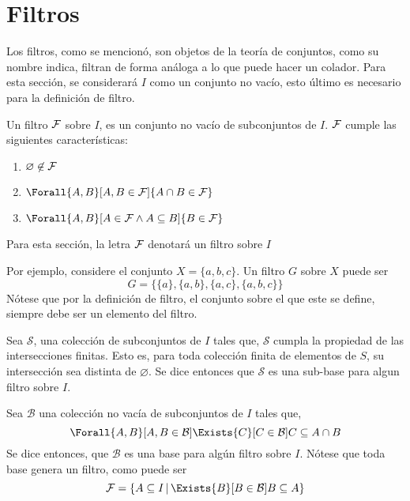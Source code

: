 \section{Filtros}

Los filtros, como se mencionó, son objetos de la teoría de conjuntos,
como su nombre indica, filtran de forma análoga a lo que
puede hacer un colador. Para esta sección, se considerará $I$ como un
conjunto no vacío, esto último es necesario para la definición de filtro.

\begin{definition}\label{def:filtro}
  Un filtro $\mathcal{F}$ sobre $I$, es un conjunto no vacío de subconjuntos de $I$.
  $\mathcal{F}$ cumple las siguientes características:
  \begin{enumerate}
    \item $\varnothing \not\in \mathcal{F}$
    \item $\Forall{A,B}[A,B \in \F]{A\cap B \in \F}$
    \item $\Forall{A,B}[A\in \F \land A \subseteq B]{B \in \F}$
  \end{enumerate}

  Para esta sección, la letra $\mathcal{F}$ denotará un filtro sobre $I$
\end{definition}

Por ejemplo, considere el conjunto $X=\{a,b,c\}$. Un filtro $G$ sobre $X$
puede ser 
\[G = \{\{a\}, \{a,b\}, \{a,c\}, \{a,b,c\}\}\]
Nótese que por la definición de filtro, el conjunto sobre el que este se
define, siempre debe ser un elemento del filtro.

\begin{definition}
  Sea $\mathcal{S}$, una colección de subconjuntos de $I$ tales que,
  $\mathcal{S}$ cumpla la propiedad de las intersecciones finitas. Esto es,
  para toda colección finita de elementos de $S$, su intersección sea
  distinta de $\varnothing$. Se dice entonces que $\mathcal{S}$ es una
  sub-base para algun filtro sobre $I$.
\end{definition}

\begin{definition}
  Sea $\mathcal{B}$ una colección no vacía de subconjuntos de $I$ tales
  que,
  \[
    \Forall{A,B}[A,B \in \mathcal{B}]{
      \Exists{C}[C\in\mathcal{B}]{C \subseteq A \cap B}
      }
  \]
  Se dice entonces, que $\mathcal{B}$ es una base para algún filtro sobre $I$.
  Nótese que toda base genera un filtro, como puede ser
  \[\F = \{A \subseteq I \,|\, \Exists{B}[B\in\mathcal{B}]{B\subseteq A}\}\]
\end{definition}

